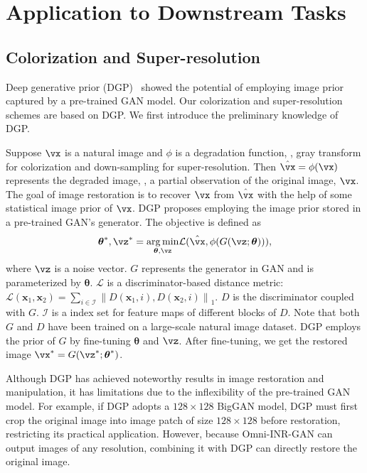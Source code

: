 \documentclass[paper_2425.tex]{subfiles}
\begin{document}
\section{Application to Downstream Tasks}
\label{apx:sec:downstream_tasks}


\subsection{Colorization and Super-resolution}

Deep generative prior (DGP)~\cite{pan2020Exploiting} showed the potential of employing image prior captured by a pre-trained GAN model. Our colorization and super-resolution schemes are based on DGP. We first introduce the preliminary knowledge of DGP.

Suppose $\vx$ is a natural image and $\phi$ is a degradation function, \eg, gray transform for colorization and down-sampling for super-resolution. Then $\hat{\vx}=\phi{(\vx)}$ represents the degraded image, \ie, a partial observation of the original image, $\vx$. The goal of image restoration is to recover $\vx$ from $\hat{\vx}$ with the help of some statistical image prior of $\vx$. DGP proposes employing the image prior stored in a pre-trained GAN's generator. The objective is defined as
\begin{equation}
\begin{aligned}
    \boldsymbol{\theta}^{*}, \vz^{*}=
    \underset{\boldsymbol{\theta}, \vz}{\arg \min } \mathcal{L}(\hat{\vx}, \phi(G(\vz ; \boldsymbol{\theta}))),
  \end{aligned}
\label{apx:equ:dgp_objective}
\end{equation}
where $\vz$ is a noise vector. $G$ represents the generator in GAN and is parameterized by $\boldsymbol{\theta}$. $\mathcal{L}$ is a discriminator-based distance metric: $\mathcal{L}\left(\mathbf{x}_{1}, \mathbf{x}_{2}\right)=\sum_{i \in \mathcal{I}}\left\|D\left(\mathbf{x}_{1}, i\right), D\left(\mathbf{x}_{2}, i\right)\right\|_{1}$. $D$ is the discriminator coupled with $G$. $\mathcal{I}$ is a index set for feature maps of different blocks of $D$. Note that both $G$ and $D$ have been trained on a large-scale natural image dataset. DGP employs the prior of $G$ by fine-tuning $\boldsymbol{\theta}$ and $\vz$. After fine-tuning, we get the restored image $\vx^{*}=G(\vz^{*} ; \boldsymbol{\theta}^{*})$.


Although DGP has achieved noteworthy results in image restoration and manipulation, it has limitations due to the inflexibility of the pre-trained GAN model. For example, if DGP adopts a $128\times128$ BigGAN model, DGP must first crop the original image into image patch of size $128\times128$ before restoration, restricting its practical application. However, because Omni-INR-GAN can output images of any resolution, combining it with DGP can directly restore the original image.
\end{document}
